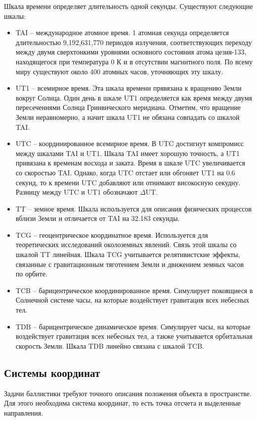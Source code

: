Шкала времени определяет длительность одной секунды. Существуют следующие шкалы:
\begin{itemize}
    \item TAI -- международное атомное время.
    1 атомная секунда определяется длительностью 9,192,631,770 периодов излучения, 
    соответствующих переходу между двумя сверхтонкими уровнями основного состояния
    атома цезия-133, находящегося при температура 0 К и в отсутствии магнитного поля.
    По всему миру существуют около 400 атомных часов, уточняющих эту шкалу.
    \item UT1 -- всемирное время.  Эта шкала времени прявязана к вращению Земли вокруг Солнца.
    Один день в шкале UT1 определяется как время между двумя пересечениями
    Солнца Гринвического меридиана.
    Отметим, что вращение Земли неравномерно, а начит шкала UT1 не обязана
    совпадать со шкалой TAI.
    \item UTC -- координированное всемирное время. 
    В UTC достигнут компромисс между шкалами TAI и UT1. Шкала TAI имеет
    хорошую точность, а UT1 привязана к временам восхода и заката. 
    Время в шкале UTC увеличивается со скоростью TAI. Однако, когда UTC отстает
    или обгоняет UT1 на 0.6 секунд, то к времени UTC добавляют или отнимают
    високосную секудну. Разницу между UTC и UT1 обозначают $\Delta$UT.
    \item TT -- земное время. Шкала используется для описания
    физических процессов вблизи Земли и отличается от TAI на 32.183 секунды.
    \item TCG -- геоцентрическое координатное время. Используется для теоретических
    исследований околоземных явлений. Связь этой шкалы со шкалой TT линейная.
    Шкала TCG учитывается релятивистские эффекты, связанные с гравитационным
    тяготением Земли и движением земных часов по орбите.
    \item TCB -- барицентрическое координированное время. Симулирует покоящиеся в Солнечной
    системе часы, на которые воздействует гравитация всех небесных тел.
    \item TDB -- барицентрическое динамическое время. Симулирует часы, на которые
    воздействует гравитация всех небесных тел, а также учитывается орбитальная
    скорость Земли. Шкала TDB линейно связана с шкалой TCB.
\end{itemize}

\subsection{Системы координат}
Задачи баллистики требуют точного описания положения объекта в пространстве.
Для этого необходима система координат, то есть точка отсчета и выделенные направления.

